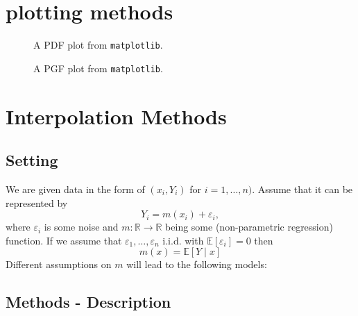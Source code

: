 \chapter{plotting methods}
\begin{figure}[]
    \begin{center}
        \fbox{\scalebox{0.5}{}}
    \end{center}
    \caption{A PDF plot from \texttt{matplotlib}.}
\end{figure}

\begin{figure}[]
    \begin{center}
    \end{center}
    \caption{A PGF plot from \texttt{matplotlib}.}
\end{figure}


\chapter{Interpolation Methods}

\section{Setting}

We are given data in the form of $\left(x_{i}, Y_{i}\right)$ for $i=1, \ldots, n)$. Assume that it can be represented by
$$
    Y_{i}=m\left(x_{i}\right)+\varepsilon_{i},
$$
where $\varepsilon_i$ is some noise and $m: \mathbb{R} \rightarrow \mathbb{R}$ being some (non-parametric regression) function. If we assume that $\varepsilon_{1}, \ldots, \varepsilon_{n}$ i.i.d. with $\mathbb{E}\left[\varepsilon_{i}\right]=0$ then $$m(x)=\mathbb{E}[Y \mid x]$$
Different assumptions on $m$ will lead to the following models:



\section{Methods - Description}

